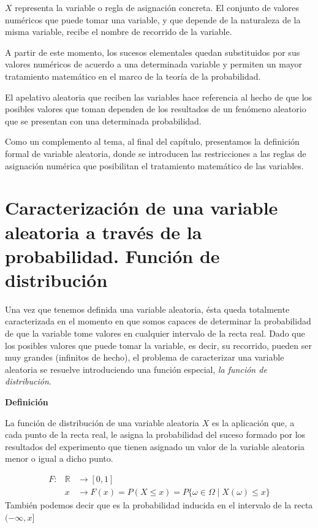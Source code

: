 \documentclass[
  a4paper,
  DIV=11,
  numbers=noendperiod]{scrreprt}
\begin{document}
\(X\) representa la variable o regla de asignación concreta. El conjunto
de valores numéricos que puede tomar una variable, y que depende de la
naturaleza de la misma variable, recibe el nombre de recorrido de la
variable.

A partir de este momento, los sucesos elementales quedan substituidos
por sus valores numéricos de acuerdo a una determinada variable y
permiten un mayor tratamiento matemático en el marco de la teoría de la
probabilidad.

El apelativo aleatoria que reciben las variables hace referencia al
hecho de que los posibles valores que toman dependen de los resultados
de un fenómeno aleatorio que se presentan con una determinada
probabilidad.

Como un complemento al tema, al final del capítulo, presentamos la
definición formal de variable aleatoria, donde se introducen las
restricciones a las reglas de asignación numérica que posibilitan el
tratamiento matemático de las variables.

\section{Caracterización de una variable aleatoria a través de la
probabilidad. Función de
distribución}\label{caracterizaciuxf3n-de-una-variable-aleatoria-a-travuxe9s-de-la-probabilidad.-funciuxf3n-de-distribuciuxf3n}

Una vez que tenemos definida una variable aleatoria, ésta queda
totalmente caracterizada en el momento en que somos capaces de
determinar la probabilidad de que la variable tome valores en cualquier
intervalo de la recta real. Dado que los posibles valores que puede
tomar la variable, es decir, su recorrido, pueden ser muy grandes
(infinitos de hecho), el problema de caracterizar una variable aleatoria
se resuelve introduciendo una función especial, \emph{la función de
distribución}.

\textbf{Definición}

La función de distribución de una variable aleatoria \(X\) es la
aplicación que, a cada punto de la recta real, le asigna la probabilidad
del suceso formado por los resultados del experimento que tienen
asignado un valor de la variable aleatoria menor o igual a dicho punto.

\[
\begin{array}{rll}
F: & \mathbb{R} & \rightarrow[0,1] \\
& x & \rightarrow F(x)=P(X \leq x)=P\{\omega \in \Omega \mid X(\omega) \leq x\}
\end{array}
\] También podemos decir que es la probabilidad inducida en el intervalo
de la recta \((-\infty, x]\)
\end{document}
